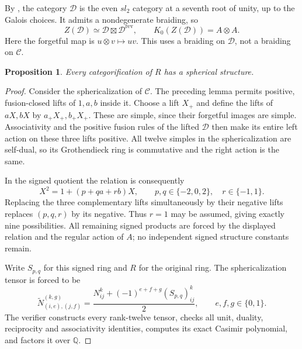 \documentclass[11pt]{article}
\newtheorem{proposition}{Proposition}
\begin{document}
By \cite[Theorem 1.1]{OstrikRank3}, the category $\mathcal D$ is the
even $sl_2$ category at a seventh root of unity, up to the Galois choices.
It admits a nondegenerate braiding, so
\[
 Z(\mathcal D)\simeq\mathcal D\boxtimes\mathcal D^{\mathrm{rev}},
 \qquad K_0(Z(\mathcal D))=A\otimes A.
\]
Here the forgetful map is $u\otimes v\mapsto uv$. This uses a braiding on
$\mathcal D$, not a braiding on $\mathcal C$.

\begin{proposition}
Every categorification of $R$ has a spherical structure.
\end{proposition}
\begin{proof}
Consider the sphericalization of $\mathcal C$. The preceding lemma permits
positive, fusion-closed lifts of $1,a,b$ inside it. Choose a lift $X_+$ and
define the lifts of $aX,bX$ by $a_+X_+,b_+X_+$. These are simple, since their
forgetful images are simple. Associativity and the positive fusion rules of
the lifted $\mathcal D$ then make its entire left action on these three lifts
positive. All twelve simples in the sphericalization are self-dual, so its
Grothendieck ring is commutative and the right action is the same.

In the signed quotient the relation is consequently
\[
 X^2=1+(p+qa+rb)X,
 \qquad p,q\in\{-2,0,2\},\quad r\in\{-1,1\}.
\]
Replacing the three complementary lifts simultaneously by their negative
lifts replaces $(p,q,r)$ by its negative. Thus $r=1$ may be assumed, giving
exactly nine possibilities. All remaining signed products are forced by the
displayed relation and the regular action of $A$; no independent signed
structure constants remain.

Write $S_{p,q}$ for this signed ring and $R$ for the original ring. The
sphericalization tensor is forced to be
\[
 \widetilde N_{(i,e),(j,f)}^{(k,g)}
 =\frac{N_{ij}^k+(-1)^{e+f+g}(S_{p,q})_{ij}^k}{2},
 \qquad e,f,g\in\{0,1\}.
\]
The verifier constructs every rank-twelve tensor, checks all unit, duality,
reciprocity and associativity identities, computes its exact Casimir
polynomial, and factors it over $\mathbb Q$.


\end{proof}
\end{document}
